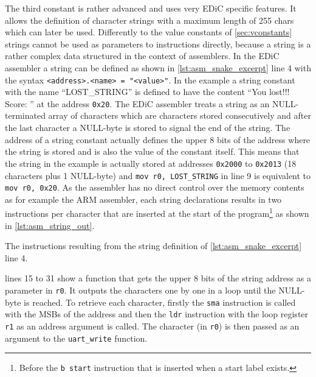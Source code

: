 The third constant is rather advanced and uses very \gls{EDiC} specific features.
It allows the definition of character strings with a maximum length of 255 chars which can later be used.
Differently to the value constants of \cref{sec:vconstants} strings cannot be used as parameters to instructions directly, because a string is a rather complex data structured in the context of assemblers.
In the \gls{EDiC} assembler a string can be defined as shown in \cref{lst:asm_snake_excerpt} line 4 with the syntax \texttt{<address>.<name> = "<value>"}.
In the example a string constant with the name ``LOST\_STRING'' is defined to have the content ``You lost!!! Score: '' at the address \texttt{0x20}.
The \gls{EDiC} assembler treats a string as an NULL-terminated array of characters which are characters stored consecutively and after the last character a NULL-byte is stored to signal the end of the string.
The address of a string constant actually defines the upper 8 bits of the address where the string is stored and is also the value of the constant itself.
This means that the string in the example is actually stored at addresses \texttt{0x2000} to \texttt{0x2013} (18 characters plus 1 NULL-byte) and \texttt{mov r0, LOST_STRING} in line 9 is equivalent to \texttt{mov r0, 0x20}.
As the assembler has no direct control over the memory contents as for example the ARM assembler, each string declarations results in two instructions per character that are inserted at the start of the program\footnote{Before the \texttt{b start} instruction that is inserted when a start label exists.} as shown in \cref{lst:asm_string_out}.

\begin{listing}[t]
  \caption{The instructions resulting from the string definition of \cref{lst:asm_snake_excerpt} line 4.}
  \label{lst:asm_string_out}
\end{listing}
 lines 15 to 31 show a function that gets the upper 8 bits of the string address as a parameter in \texttt{r0}.
It outputs the characters one by one in a loop until the NULL-byte is reached.
To retrieve each character, firstly the \texttt{sma} instruction is called with the \glspl{MSB} of the address and then the \texttt{ldr} instruction with the loop register \texttt{r1} as an address argument is called.
The character (in \texttt{r0}) is then passed as an argument to the \texttt{uart\_write} function.


